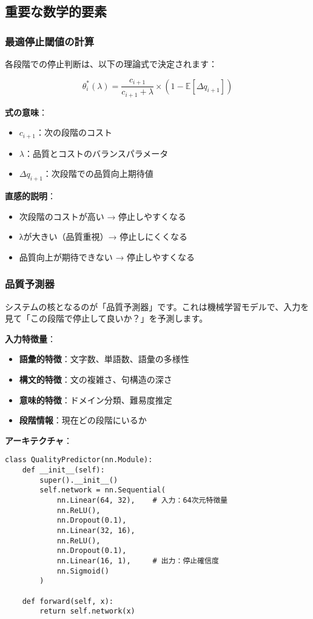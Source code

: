 \documentclass[a4paper,12pt]{jsarticle}
\begin{document}
\subsection{重要な数学的要素}

\subsubsection{最適停止閾値の計算}

各段階での停止判断は、以下の理論式で決定されます：

\begin{equation}
\theta_i^*(\lambda) = \frac{c_{i+1}}{c_{i+1} + \lambda} \times (1 - \mathbb{E}[\Delta q_{i+1}])
\end{equation}

\textbf{式の意味}：
\begin{itemize}
\item $c_{i+1}$：次の段階のコスト
\item $\lambda$：品質とコストのバランスパラメータ
\item $\Delta q_{i+1}$：次段階での品質向上期待値
\end{itemize}

\textbf{直感的説明}：
\begin{itemize}
\item 次段階のコストが高い → 停止しやすくなる
\item λが大きい（品質重視）→ 停止しにくくなる
\item 品質向上が期待できない → 停止しやすくなる
\end{itemize}

\subsubsection{品質予測器}

システムの核となるのが「品質予測器」です。これは機械学習モデルで、入力を見て「この段階で停止して良いか？」を予測します。

\textbf{入力特徴量}：
\begin{itemize}
\item \textbf{語彙的特徴}：文字数、単語数、語彙の多様性
\item \textbf{構文的特徴}：文の複雑さ、句構造の深さ
\item \textbf{意味的特徴}：ドメイン分類、難易度推定
\item \textbf{段階情報}：現在どの段階にいるか
\end{itemize}

\textbf{アーキテクチャ}：
\begin{lstlisting}[style=pythonstyle]
class QualityPredictor(nn.Module):
    def __init__(self):
        super().__init__()
        self.network = nn.Sequential(
            nn.Linear(64, 32),    # 入力：64次元特徴量
            nn.ReLU(),
            nn.Dropout(0.1),
            nn.Linear(32, 16),
            nn.ReLU(), 
            nn.Dropout(0.1),
            nn.Linear(16, 1),     # 出力：停止確信度
            nn.Sigmoid()
        )
    
    def forward(self, x):
        return self.network(x)
\end{lstlisting}
\end{document}
